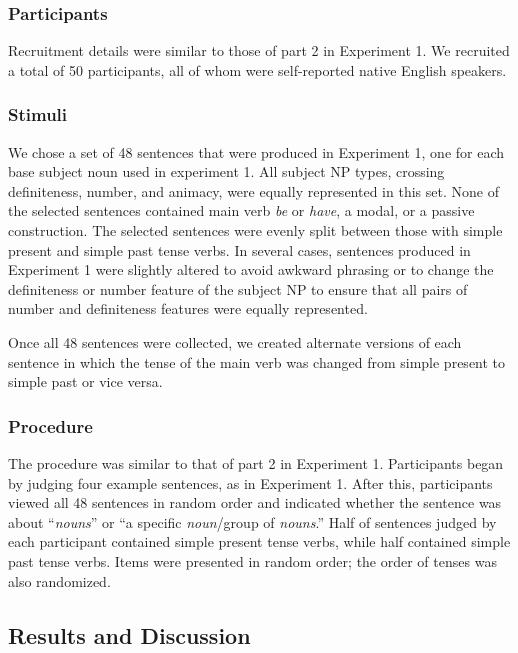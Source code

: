 \documentclass[10pt,letterpaper]{article}
\begin{document}
\subsubsection{Participants}

Recruitment details were similar to those of part 2 in Experiment 1. We recruited a total of 50 participants, all of whom were self-reported native English speakers.

\subsubsection{Stimuli}

We chose a set of 48 sentences that were produced in Experiment 1, one for each base subject noun used in experiment 1. All subject NP types, crossing definiteness, number, and animacy, were equally represented in this set. None of the selected sentences contained main verb \textit{be} or \textit{have}, a modal, or a passive construction. The selected sentences were evenly split between those with simple present and simple past tense verbs. In several cases, sentences produced in Experiment 1 were slightly altered to avoid awkward phrasing or to change the definiteness or number feature of the subject NP to ensure that all pairs of number and definiteness features were equally represented.

Once all 48 sentences were collected, we created alternate versions of each sentence in which the tense of the main verb was changed from simple present to simple past or vice versa.

\subsubsection{Procedure}

The procedure was similar to that of part 2 in Experiment 1. Participants began by judging four example sentences, as in Experiment 1. After this, participants viewed all 48 sentences in random order and indicated whether the sentence was about ``\textit{nouns}'' or ``a specific \textit{noun}/group of \textit{nouns}.'' Half of sentences judged by each participant contained simple present tense verbs, while half contained simple past tense verbs. Items were presented in random order; the order of tenses was also randomized.

\subsection{Results and Discussion}
\end{document}
